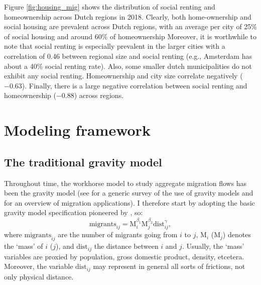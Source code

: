 \documentclass[fleqn,10pt]{SelfArx} %
\begin{document}
Figure \ref{fig:housing_mig} shows the distribution of social renting and
homeownership across Dutch regions in 2018. Clearly, both home-ownership
and social housing are prevalent across Dutch regions, with an average
per city of 25\% of social housing and around 60\% of homeownership Moreover, it
is worthwhile to note that social renting is especially prevalent in the larger
cities with a correlation of 0.46 between regional size and social renting (e.g.,
Amsterdam has about a 40\% social renting rate). Also, some smaller dutch
municipalities do not exhibit any social renting. Homeownership and city size
correlate negatively ($-0.63$). Finally, there is a large negative correlation
between social renting and homeownership ($-0.88$) across regions.

\section{Modeling framework}

\subsection{The traditional gravity model}

Throughout time, the workhorse model to study aggregate migration flows has been
the gravity model (see \citet{anderson2011gravity} for a generic survey of the
use of gravity models and \citet{poot2016gravity} for an overview of migration
applications). I therefore start by adopting the basic gravity model
specification pioneered by \citet{tinbergen1962shaping}, so:
\begin{equation}
  \text{migrants}_{ij} = \text{M}_i^{\beta_1}\text{M}_j^{\beta_2}\text{dist}_{ij}^\gamma,
  \label{eq:grav}
\end{equation}
where $\text{migrants}_{ij}$ are the number of migrants going from $i$ to $j$,
$\text{M}_i$ ($\text{M}_j$) denotes the `mass' of $i$ ($j$), and
$\text{dist}_{ij}$ the distance between $i$ and $j$. Usually, the `mass'
variables are proxied by population, gross domestic product, density, etcetera.
Moreover, the variable $\text{dist}_{ij}$ may represent in general all sorts of
frictions, not only physical distance.
\end{document}
